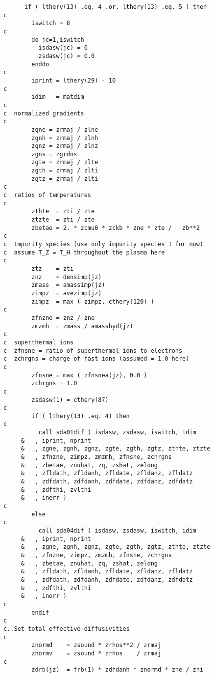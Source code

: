 \begin{verbatim}
      if ( lthery(13) .eq. 4 .or. lthery(13) .eq. 5 ) then
c
        iswitch = 8
c
        do jc=1,iswitch
          isdasw(jc) = 0
          zsdasw(jc) = 0.0
        enddo
c
        iprint = lthery(29) - 10
c
        idim   = matdim
c
c  normalized gradients
c
        zgne = zrmaj / zlne
        zgnh = zrmaj / zlnh
        zgnz = zrmaj / zlnz
        zgns = zgrdns
        zgte = zrmaj / zlte
        zgth = zrmaj / zlti
        zgtz = zrmaj / zlti
c
c  ratios of temperatures
c
        zthte  = zti / zte
        ztzte  = zti / zte
        zbetae = 2. * zcmu0 * zckb * zne * zte /   zb**2
c
c  Impurity species (use only impurity species 1 for now)
c  assume T_Z = T_H throughout the plasma here
c
        ztz    = zti
        znz    = densimp(jz)
        zmass  = amassimp(jz)
        zimpz  = avezimp(jz)
        zimpz  = max ( zimpz, cthery(120) )
c
        zfnzne = znz / zne
        zmzmh  = zmass / amasshyd(jz)
c
c  superthermal ions
c  zfnsne = ratio of superthermal ions to electrons
c  zchrgns = charge of fast ions (assumed = 1.0 here)
c
        zfnsne = max ( zfnsnea(jz), 0.0 )
        zchrgns = 1.0
c
        zsdasw(1) = cthery(87)
c
        if ( lthery(13) .eq. 4) then
c
          call sda01dif ( isdasw, zsdasw, iswitch, idim
     &   , iprint, nprint
     &   , zgne, zgnh, zgnz, zgte, zgth, zgtz, zthte, ztzte
     &   , zfnzne, zimpz, zmzmh, zfnsne, zchrgns
     &   , zbetae, znuhat, zq, zshat, zelong
     &   , zfldath, zfldanh, zfldate, zfldanz, zfldatz
     &   , zdfdath, zdfdanh, zdfdate, zdfdanz, zdfdatz
     &   , zdfthi, zvlthi
     &   , inerr )
c
        else
c
          call sda04dif ( isdasw, zsdasw, iswitch, idim
     &   , iprint, nprint
     &   , zgne, zgnh, zgnz, zgte, zgth, zgtz, zthte, ztzte
     &   , zfnzne, zimpz, zmzmh, zfnsne, zchrgns
     &   , zbetae, znuhat, zq, zshat, zelong
     &   , zfldath, zfldanh, zfldate, zfldanz, zfldatz
     &   , zdfdath, zdfdanh, zdfdate, zdfdanz, zdfdatz
     &   , zdfthi, zvlthi
     &   , inerr )
c
        endif
c
c..Set total effective diffusivities
c
        znormd    = zsound * zrhos**2 / zrmaj
        znormv    = zsound * zrhos    / zrmaj
c
        zdrb(jz)  = frb(1) * zdfdanh * znormd * zne / zni


\end{verbatim}
